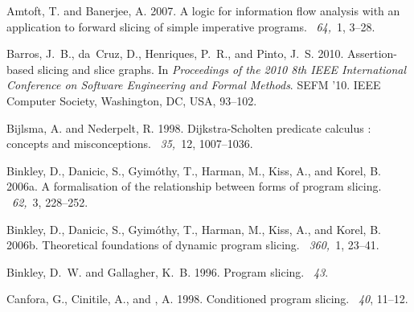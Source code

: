 \documentclass[prodmode,acmtocl]{acmsmall}
\newcommand{\0}{\mbox{\bf 0}}
\begin{document}
\begin{thebibliography}{}

{\sc Amtoft, T.} {\sc and} {\sc Banerjee, A.} 2007.
\newblock A logic for information flow analysis with an application to forward
  slicing of simple imperative programs.
~{\em 64,\/}~1, 3--28.

{\sc Barros, J.~B.}, {\sc da~Cruz, D.}, {\sc Henriques, P.~R.}, {\sc and} {\sc
  Pinto, J.~S.} 2010.
\newblock Assertion-based slicing and slice graphs.
\newblock In {\em Proceedings of the 2010 8th IEEE International Conference on
  Software Engineering and Formal Methods}. SEFM '10. IEEE Computer Society,
  Washington, DC, USA, 93--102.

{\sc Bijlsma, A.} {\sc and} {\sc Nederpelt, R.} 1998.
\newblock Dijkstra-{S}cholten predicate calculus : concepts and misconceptions.
~{\em 35,\/}~12, 1007--1036.

{\sc Binkley, D.}, {\sc Danicic, S.}, {\sc Gyim\'othy, T.}, {\sc Harman, M.},
  {\sc Kiss, A.}, {\sc and} {\sc Korel, B.} 2006a.
\newblock A formalisation of the relationship between forms of program slicing.
~{\em 62,\/}~3, 228--252.

{\sc Binkley, D.}, {\sc Danicic, S.}, {\sc Gyim\'othy, T.}, {\sc Harman, M.},
  {\sc Kiss, A.}, {\sc and} {\sc Korel, B.} 2006b.
\newblock Theoretical foundations of dynamic program slicing.
~{\em 360,\/}~1, 23--41.

{\sc Binkley, D.~W.} {\sc and} {\sc Gallagher, K.~B.} 1996.
\newblock Program slicing.
~{\em 43}.

{\sc Canfora, G.}, {\sc Cinitile, A.}, {\sc and} {, A.} 1998.
\newblock Conditioned program slicing.
~{\em 40}, 11--12.


\end{thebibliography}
\end{document}
